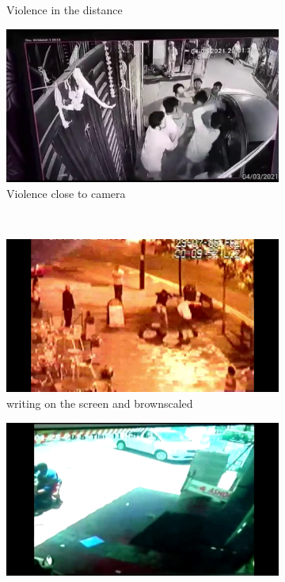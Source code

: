 \begin{figure}[]
\begin{subfigure}{.5\textwidth}
        \caption{Violence in the distance}
        \label{fig:sub3}
    \end{subfigure}%
    \begin{subfigure}{.5\textwidth}
        \centering
        \includegraphics[width=\linewidth]{./images/V89-036.png}
        \caption{Violence close to camera}
        \label{fig:sub4}
    \end{subfigure}\\
    \begin{subfigure}{.5\textwidth}
        \centering
        \includegraphics[width=\linewidth]{./images/V95-026.png}
        \caption{writing on the screen and brownscaled}
        \label{fig:sub5}
    \end{subfigure}%
    \begin{subfigure}{.5\textwidth}
        \centering
        \includegraphics[width=\linewidth]{./images/V97-050.png}

\end{subfigure}
\end{figure}
